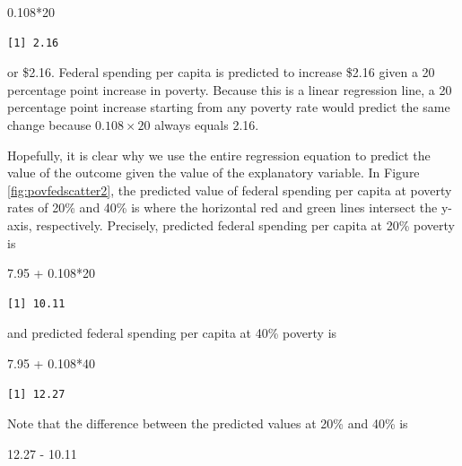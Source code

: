 \documentclass[
]{book}
\makeatletter
\newenvironment{Shaded}{\begin{snugshade}}{\end{snugshade}}
\newcommand{\DecValTok}[1]{\textcolor[rgb]{0.06,0.06,0.06}{#1}}
\newcommand{\FloatTok}[1]{\textcolor[rgb]{0.06,0.06,0.06}{#1}}
\newcommand{\SpecialCharTok}[1]{\textcolor[rgb]{0,0,0}{#1}}
\newenvironment{kframe}{%
\medskip{}
\setlength{\fboxsep}{.8em}
 \def\at@end@of@kframe{}%
 \ifinner\ifhmode%
  \def\at@end@of@kframe{\end{minipage}}%
  \begin{minipage}{\columnwidth}%
 \fi\fi%
 \def\FrameCommand##1{\hskip\@totalleftmargin \hskip-\fboxsep
 \colorbox{shadecolor}{##1}\hskip-\fboxsep
     \hskip-\linewidth \hskip-\@totalleftmargin \hskip\columnwidth}%
 \MakeFramed {\advance\hsize-\width
   \@totalleftmargin\z@ \linewidth\hsize
   \@setminipage}}%
 {\par\unskip\endMakeFramed%
 \at@end@of@kframe}
\renewenvironment{Shaded}{\begin{kframe}}{\end{kframe}}
\makeatother
\begin{document}
\begin{Shaded}
\begin{Highlighting}[]
\FloatTok{0.108}\SpecialCharTok{*}\DecValTok{20}
\end{Highlighting}
\end{Shaded}

\begin{verbatim}
[1] 2.16
\end{verbatim}

or \$2.16. Federal spending per capita is predicted to increase \$2.16 given a 20 percentage point increase in poverty. Because this is a linear regression line, a 20 percentage point increase starting from any poverty rate would predict the same change because \(0.108 \times 20\) always equals 2.16.

Hopefully, it is clear why we use the entire regression equation to predict the value of the outcome given the value of the explanatory variable. In Figure \ref{fig:povfedscatter2}, the predicted value of federal spending per capita at poverty rates of 20\% and 40\% is where the horizontal red and green lines intersect the y-axis, respectively. Precisely, predicted federal spending per capita at 20\% poverty is

\begin{Shaded}
\begin{Highlighting}[]
\FloatTok{7.95} \SpecialCharTok{+} \FloatTok{0.108}\SpecialCharTok{*}\DecValTok{20}
\end{Highlighting}
\end{Shaded}

\begin{verbatim}
[1] 10.11
\end{verbatim}

and predicted federal spending per capita at 40\% poverty is

\begin{Shaded}
\begin{Highlighting}[]
\FloatTok{7.95} \SpecialCharTok{+} \FloatTok{0.108}\SpecialCharTok{*}\DecValTok{40}
\end{Highlighting}
\end{Shaded}

\begin{verbatim}
[1] 12.27
\end{verbatim}

Note that the difference between the predicted values at 20\% and 40\% is

\begin{Shaded}
\begin{Highlighting}[]
\FloatTok{12.27} \SpecialCharTok{{-}} \FloatTok{10.11}
\end{Highlighting}
\end{Shaded}
\end{document}
